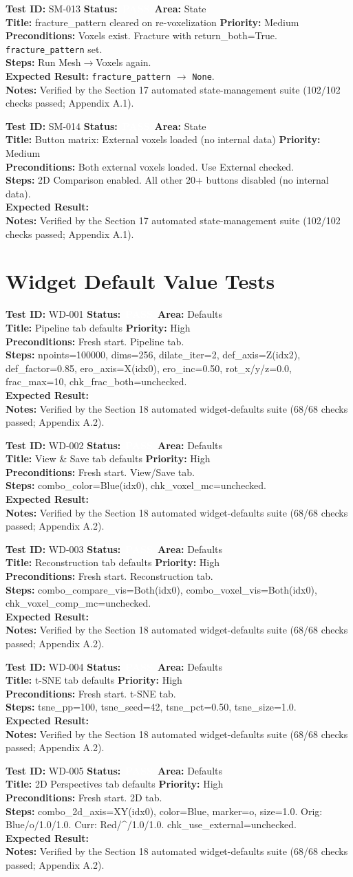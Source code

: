 \documentclass[12pt,a4paper]{article}
\newcommand{\statuspass}{\colorbox{statusgreen}{\textcolor{white}{\textbf{\,PASS\,}}}}
\newcommand{\testcase}[9]{%
  \smallskip
  \noindent\textbf{Test ID:} #1 \hfill \textbf{Status:} #2 \hfill \textbf{Area:} #3 \\
  \textbf{Title:} #4 \hfill \textbf{Priority:} #5 \\[0.3em]
  \textbf{Preconditions:} #6 \\[0.3em]
  \textbf{Steps:} #7 \\[0.3em]
  \textbf{Expected Result:} #8 \\
  \textbf{Notes:} #9
  \smallskip
}
\begin{document}
\testcase{SM-013}{\statuspass}{State}{fracture\_pattern cleared on re-voxelization}{Medium}{Voxels exist. Fracture with return\_both=True. \texttt{fracture\_pattern} set.}{Run Mesh$\rightarrow$Voxels again.}{\texttt{fracture\_pattern} $\rightarrow$ \texttt{None}.}{Verified by the Section 17 automated state-management suite (102/102 checks passed; Appendix A.1).}


\testcase{SM-014}{\statuspass}{State}{Button matrix: External voxels loaded (no internal data)}{Medium}{Both external voxels loaded. Use External checked.}{2D Comparison enabled. All other 20+ buttons disabled (no internal data).}{}{Verified by the Section 17 automated state-management suite (102/102 checks passed; Appendix A.1).}



\section{Widget Default Value Tests}

\testcase{WD-001}{\statuspass}{Defaults}{Pipeline tab defaults}{High}{Fresh start. Pipeline tab.}{npoints=100000, dims=256, dilate\_iter=2, def\_axis=Z(idx2), def\_factor=0.85, ero\_axis=X(idx0), ero\_inc=0.50, rot\_x/y/z=0.0, frac\_max=10, chk\_frac\_both=unchecked.}{}{Verified by the Section 18 automated widget-defaults suite (68/68 checks passed; Appendix A.2).}


\testcase{WD-002}{\statuspass}{Defaults}{View \& Save tab defaults}{High}{Fresh start. View/Save tab.}{combo\_color=Blue(idx0), chk\_voxel\_mc=unchecked.}{}{Verified by the Section 18 automated widget-defaults suite (68/68 checks passed; Appendix A.2).}


\testcase{WD-003}{\statuspass}{Defaults}{Reconstruction tab defaults}{High}{Fresh start. Reconstruction tab.}{combo\_compare\_vis=Both(idx0), combo\_voxel\_vis=Both(idx0), chk\_voxel\_comp\_mc=unchecked.}{}{Verified by the Section 18 automated widget-defaults suite (68/68 checks passed; Appendix A.2).}


\testcase{WD-004}{\statuspass}{Defaults}{t-SNE tab defaults}{High}{Fresh start. t-SNE tab.}{tsne\_pp=100, tsne\_seed=42, tsne\_pct=0.50, tsne\_size=1.0.}{}{Verified by the Section 18 automated widget-defaults suite (68/68 checks passed; Appendix A.2).}


\testcase{WD-005}{\statuspass}{Defaults}{2D Perspectives tab defaults}{High}{Fresh start. 2D tab.}{combo\_2d\_axis=XY(idx0), color=Blue, marker=o, size=1.0. Orig: Blue/o/1.0/1.0. Curr: Red/\textasciicircum/1.0/1.0. chk\_use\_external=unchecked.}{}{Verified by the Section 18 automated widget-defaults suite (68/68 checks passed; Appendix A.2).}
\end{document}
